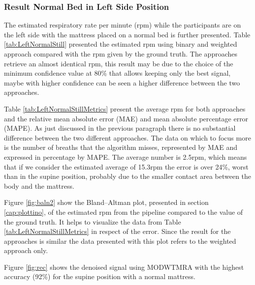 \subsubsection{Result Normal Bed in Left Side Position}   \label{cap:ResultNormalBed2}

The estimated respiratory rate per minute (rpm) while the participants are on the left side with the mattress placed on a normal bed is further presented. Table \ref{tab:LeftNormalStill} presented the estimated rpm using binary and weighted approach compared with the rpm given by the ground truth. The approaches retrieve an almost identical rpm, this result may be due to the choice of the minimum confidence value at 80\% that allows keeping only the best signal, maybe with higher confidence can be seen a higher difference between the two approaches. 

\vspace{1.3cm}
%


\vspace{0.5cm}

Table \ref{tab:LeftNormalStillMetrics} present the average rpm for both approaches  
and the relative mean absolute error (MAE) and mean absolute percentage error (MAPE). As just discussed in the previous paragraph there is no substantial difference between the two different approaches. The data on which to focus more is the number of breaths that the algorithm misses, represented by MAE and expressed in percentage by MAPE. The average number is 2.5rpm, which means that if we consider the estimated average of 15.3rpm the error is over 24\%, worst than in the supine position, probably due to the smaller contact area between the body and the mattress.

\vspace{1cm}

\vspace{0.5cm}

Figure \ref{fig:baln2} show the Bland–Altman plot, presented in section \ref{cap:plottino}, of the estimated rpm from the pipeline compared to the value of the ground truth. It helps to visualize the data from Table \ref{tab:LeftNormalStillMetrics} in respect of the error. Since the result for the approaches is similar the data presented with this plot refers to the weighted approach only.

Figure \ref{fig:rec} shows the denoised signal using MODWTMRA with the highest accuracy (92\%) for the supine position with a normal mattress.

